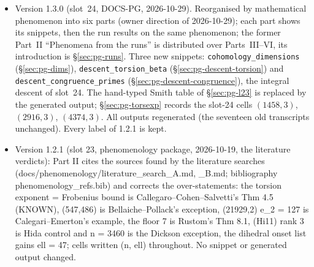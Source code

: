 \documentclass[11pt]{article}
\newcommand{\code}[1]{\texttt{#1}}
\newcommand{\file}[1]{\texttt{#1}}
\begin{document}
\begin{itemize}[leftmargin=1.6em,itemsep=2pt]
  \emph{History of \S\ref{sec:pg-torsexp}.} Version~1.2.0 stated $e_1=\beta(n,\ell)$ as an empirical observation; it is Callegaro--Cohen--Salvetti's
  theorem. Two earlier forms were wrong, both refuted by the data: ``$e_1=v_2(n)+1$'' fails at every power of $2$ ($10/10$ up to $2048$), and
  ``exponent $1$ at $\ell=3$'' fails at every $n$ with $3\mid n$ ($49$ of the $146$ DEEP-1 cells). The note on the DEEP-1 data stated
  $e_1=v_3(n)+1$, the restriction of $\beta$ to its grid (no $n=2\cdot3^{j}$); both datasets measure the same invariant and agree on the overlap
  $n\in\{600,700\}$. The cells $(1458,3)$, $(2916,3)$, $(4374,3)$ were run in slot~24 (L23S14, catalogue entry PH-01) to check the exception
  beyond DEEP-1. Version~1.2.0 of \S\ref{sec:pg-dihedral3} named only $\ell=59$ as the next onset; $\ell=47$ had been omitted. The table of
  \S\ref{sec:pg-missing} replaced, in slot~22, a list of candidate verbs (\code{level\_n}, \code{nebentypus(N, chi, n, ell)}, \code{lvalue},
  \code{hida\_lambda(ell, class)}, \code{hida\_tower}, \code{kummer\_unit}, \code{forms\_algebra(k, ell, K)}, \code{pow}, a store reader); the
  store reader became the atlas channel, not a verb (owner decision of slot~22).
\item Version 1.3.0 (slot~24, DOCS-PG, 2026-10-29). Reorganised by mathematical phenomenon into six parts (owner direction of 2026-10-29); each
  part shows its snippets, then the run results on the same phenomenon; the former Part~II ``Phenomena from the runs'' is distributed over
  Parts~III--VI, its introduction is \S\ref{sec:pg-runs}. Three new snippets: \file{cohomology\_dimensions} (\S\ref{sec:pg-dims}),
  \file{descent\_torsion\_beta} (\S\ref{sec:pg-descent-torsion}) and \file{descent\_congruence\_primes} (\S\ref{sec:pg-descent-congruence}), the
  integral descent of slot~24. The hand-typed Smith table of \S\ref{sec:pg-l23} is replaced by the generated output; \S\ref{sec:pg-torsexp}
  records the slot-24 cells $(1458,3)$, $(2916,3)$, $(4374,3)$. All outputs regenerated (the seventeen old transcripts unchanged). Every label
  of 1.2.1 is kept.
\item Version 1.2.1 (slot 23, phenomenology package, 2026-10-19, the literature verdicts): Part II cites the sources found by the literature searches (docs/phenomenology/literature\_search\_A.md, \_B.md; bibliography phenomenology\_refs.bib) and corrects the over-statements: the torsion exponent = Frobenius bound is Callegaro--Cohen--Salvetti's Thm 4.5 (KNOWN), (547,486) is Bellaiche--Pollack's exception, (21929,2) e\_2 = 127 is Calegari--Emerton's example, the floor 7 is Rustom's Thm 8.1, (Hi11) rank 3 is Hida control and n = 3460 is the Dickson exception, the dihedral onset list gains ell = 47; cells written (n, ell) throughout. No snippet or generated output changed.

\end{itemize}
\end{document}

